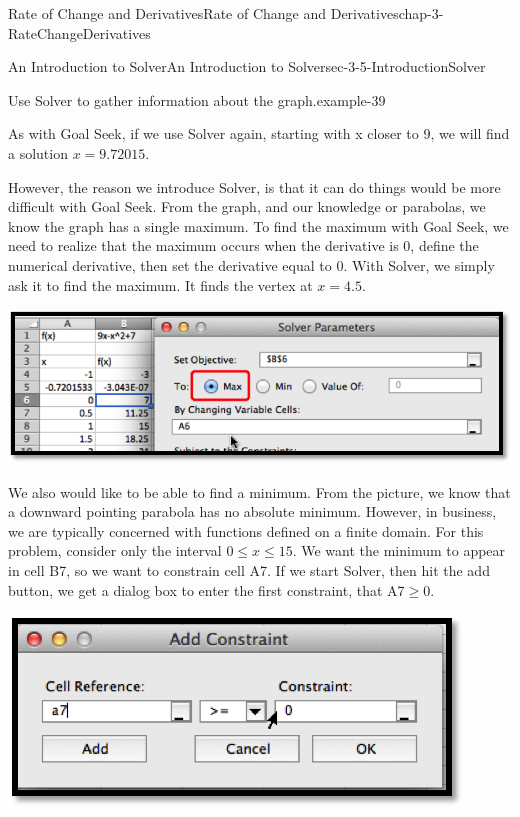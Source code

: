 \documentclass[oneside,10pt,]{book}
\numberwithin{equation}{section}
\begin{document}
\begin{chapterptx}{Rate of Change and Derivatives}{}{Rate of Change and Derivatives}{}{}{chap-3-RateChangeDerivatives}
\begin{sectionptx}{An Introduction to Solver}{}{An Introduction to Solver}{}{}{sec-3-5-IntroductionSolver}
\begin{example}{Use Solver to gather information about the graph.}{example-39}
\begin{sidebyside}{1}{0.15}{0.15}{0}
\begin{sbspanel}{0.7}
\end{sbspanel}%
\end{sidebyside}%
\par
\hypertarget{p-1335}{}%
As with Goal Seek, if we use Solver again, starting with x closer to 9, we will find a solution \(x=9.72015\).%
\par
\hypertarget{p-1336}{}%
However, the reason we introduce Solver, is that it can do things would be more difficult with Goal Seek.  From the graph, and our knowledge or parabolas, we know the graph has a single maximum.  To find the maximum with Goal Seek, we need to realize that the maximum occurs when the derivative is 0, define the numerical derivative, then set the derivative equal to 0.  With Solver, we simply ask it to find the maximum.  It finds the vertex at \(x=4.5\).%
\begin{sidebyside}{1}{0.15}{0.15}{0}%
\begin{sbspanel}{0.7}%
\includegraphics[width=1\linewidth]{images/sec3-5-5.png}
\end{sbspanel}%
\end{sidebyside}%
\par
\hypertarget{p-1337}{}%
We also would like to be able to find a minimum.  From the picture, we know that a downward pointing parabola has no absolute minimum.  However, in business, we are typically concerned with functions defined on a finite domain.  For this problem, consider only the interval \(0\le x\le 15\).  We want the minimum to appear in cell B7, so we want to constrain cell A7.  If we start Solver, then hit the add button, we get a dialog box to enter the first constraint, that A7\(\ge \)0.%
\begin{sidebyside}{1}{0.3}{0.3}{0}%
\begin{sbspanel}{0.4}%
\includegraphics[width=1\linewidth]{images/sec3-5-6.png}

\end{sbspanel}
\end{sidebyside}
\end{example}
\end{sectionptx}
\end{chapterptx}
\end{document}
